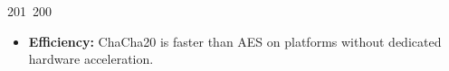 201~200~\documentclass{article}
\begin{document}
\begin{itemize}
	                                                                                                                                                                                                                                                                                                	                                                                                                                                        	    	                                                                                                	                                                                                                                                                                                                                                                                                                                                	                                                                        	                                                                        	                                                                                                                                        	                                                                                                                                                                                                                        	                                                                                                                            	                                                                	                                                                                                                                                                                                    \item \textbf{Efficiency:} ChaCha20 is faster than AES on platforms without dedicated hardware acceleration.

\end{itemize}
\end{document}
